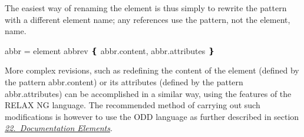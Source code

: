\par\egroup 
 The easiest way of renaming the element is thus simply to rewrite the pattern with a different element name; any references use the pattern, not the element, name. \par\hfill\bgroup\exampleFont\vskip 10pt\begin{shaded}
\obeyspaces abbr = element abbrev ❴ abbr.content, abbr.attributes ❵\end{shaded}
\par\egroup 
 More complex revisions, such as redefining the content of the element (defined by the pattern \textsf{abbr.content}) or its attributes (defined by the pattern \textsf{abbr.attributes}) can be accomplished in a similar way, using the features of the RELAX NG language. The recommended method of carrying out such modifications is however to use the ODD language as further described in section \textit{\hyperref[TD]{22.\ Documentation Elements}}.
